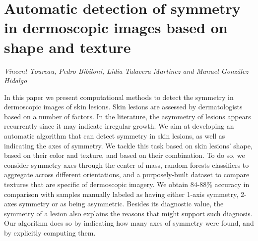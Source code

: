 \documentclass[../booklet.tex]{subfiles}
\begin{document}
\section[Automatic detection of symmetry in dermoscopic images based on shape and texture. {\it Vincent Toureau, Pedro Bibiloni, Lidia Talavera-Martínez and Manuel González-Hidalgo}]{Automatic detection of symmetry in dermoscopic images based on shape and texture}
   

\begin{center}
  {\it Vincent Toureau, Pedro Bibiloni, Lidia Talavera-Martínez and Manuel González-Hidalgo}
\end{center}

\vskip 0.8cm


In this paper we present computational methods to detect the symmetry in dermoscopic images of skin lesions.
Skin lesions are assessed by dermatologists based on a number of factors.
In the literature, the asymmetry of lesions appears recurrently since it may indicate irregular growth.
We aim at developing an automatic algorithm that can detect symmetry in skin lesions, as well as indicating the axes of symmetry.
We tackle this task based on skin lesions' shape, based on their color and texture, and based on their combination.
To do so, we consider symmetry axes through the center of mass, random forests classifiers to aggregate across different orientations, and a purposely-built dataset to compare textures that are specific of dermoscopic imagery.
We obtain 84-88\% accuracy in comparison with samples manually labeled as having either 1-axis symmetry, 2-axes symmetry or as being asymmetric.
Besides its diagnostic value, the symmetry of a lesion also explains the reasons that might support such diagnosis.
Our algorithm does so by indicating how many axes of symmetry were found, and by explicitly computing them.

\end{document}
